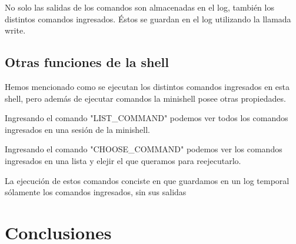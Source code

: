 \documentclass[11pt]{article}
\begin{document}
No solo las salidas de los comandos son almacenadas en el log, también los distintos comandos ingresados. Éstos se guardan en el log utilizando la llamada write.

\subsection{Otras funciones de la shell}
Hemos mencionado como se ejecutan los distintos comandos ingresados en esta shell, pero además de ejecutar comandos la minishell posee otras propiedades.

Ingresando el comando "LIST\_COMMAND" podemos ver todos los comandos ingresados en una sesión de la minishell.

Ingresando el comando "CHOOSE\_COMMAND" podemos ver los comandos ingresados en una lista y elejir el que queramos para reejecutarlo.

La ejecución de estos comandos conciste en que guardamos en un log temporal sólamente los comandos ingresados, sin sus salidas

\section{Conclusiones}
\end{document}
